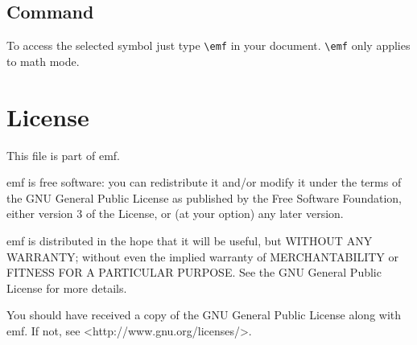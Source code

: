 \documentclass[11pt,a4paper,british]{scrartcl}
\begin{document}
\subsection{Command}
\label{sec:command}

To access the selected symbol just type \lstinline|\emf| in your
document. \lstinline|\emf| only applies to math mode.

\section{License}
\label{sec:license}

This file is part of emf.

emf is free software: you can redistribute it and/or modify it under
the terms of the GNU General Public License as published by the Free
Software Foundation, either version 3 of the License, or (at your
option) any later version.

emf is distributed in the hope that it will be useful, but WITHOUT ANY
WARRANTY; without even the implied warranty of MERCHANTABILITY or
FITNESS FOR A PARTICULAR PURPOSE. See the GNU General Public License
for more details.

You should have received a copy of the GNU General Public License
along with emf. If not, see <http://www.gnu.org/licenses/>.
\end{document}
